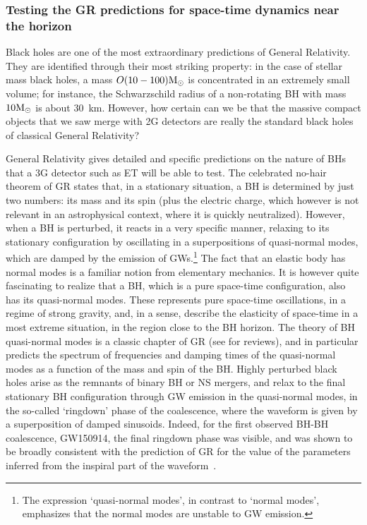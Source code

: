 \subsubsection{Testing the GR predictions for space-time dynamics near the horizon}


Black holes are one of the most extraordinary predictions of General Relativity. They are identified through  their most striking property: in the case of stellar mass black holes, a mass $O(10-100)\mathrm{M}_{\odot}$ is concentrated in an extremely small volume; for instance, the Schwarzschild radius of a non-rotating BH with mass $10\mathrm{M}_{\odot}$ is about 30~km. However, how certain can we be that the massive compact objects that we saw merge with 2G detectors are really the standard black holes of classical General Relativity?


General Relativity gives detailed and specific predictions on the nature of BHs that a 3G detector such as ET will be able to test. The celebrated no-hair theorem  of GR states that, in  a stationary situation, a BH is determined
by just two numbers: its mass and its spin (plus the electric charge, which however is not relevant in an astrophysical context, where it is quickly neutralized). However, when a BH is perturbed, it reacts in a very specific manner, relaxing to its stationary configuration by oscillating in a superpositions of 
quasi-normal modes, which are damped by the emission of GWs.\footnote{The expression `quasi-normal modes', in contrast to `normal modes', emphasizes that the normal modes are unstable to GW emission.} The fact that an elastic body has normal modes is a familiar notion from elementary mechanics. It is however quite fascinating to realize  that a BH, which is a pure space-time configuration, also has its quasi-normal modes. These represents pure space-time oscillations, in a regime of strong gravity, and, in a sense, describe the elasticity of space-time in a most extreme situation, in the region close to the BH horizon. The theory of BH quasi-normal modes is a classic chapter of GR (see \cite{Berti:2009kk,Maggiore:2018zz} for reviews), and in particular predicts the spectrum of frequencies and damping times of the quasi-normal modes as a function of the mass and spin of the BH. Highly perturbed black holes arise as the 
remnants of binary BH or NS mergers, and relax to the final stationary BH configuration through GW emission in the quasi-normal modes, in the so-called `ringdown' phase of the coalescence, where the waveform is given by a superposition of damped sinusoids. Indeed, for the first observed BH-BH coalescence, GW150914, the final ringdown phase was visible, and was shown to be broadly consistent with the prediction of GR for the value of the parameters inferred from  the inspiral part of the waveform~\cite{TheLIGOScientific:2016src}. 

